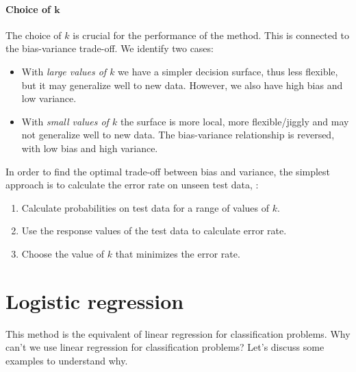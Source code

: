 \paragraph{Choice of $\bm{k}$}

The choice of $k$ is crucial for the performance of the method. This is connected to the bias-variance trade-off. We identify two cases:
\begin{itemize}
    \item With \emph{large values of $k$} we have a simpler decision surface, thus less flexible, but it may generalize well to new data. However, we also have high bias and low variance.
    \item With \emph{small values of $k$} the surface is more local, more flexible/jiggly and may not generalize well to new data. The bias-variance relationship is reversed, with low bias and high variance.
\end{itemize}

In order to find the optimal trade-off between bias and variance, the simplest approach is to calculate the error rate on unseen test data, \ie:
\begin{enumerate}
    \item Calculate probabilities on test data for a range of values of $k$.
    \item Use the response values of the test data to calculate error rate.
    \item Choose the value of $k$ that minimizes the error rate.
\end{enumerate}

\section{Logistic regression}

This method is the equivalent of linear regression for classification problems. Why can't we use linear regression for classification problems? Let's discuss some examples to understand why.

